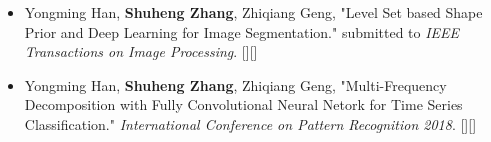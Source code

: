 %
%


\begin{itemize}
	\item Yongming Han, \textbf{Shuheng Zhang}, Zhiqiang Geng, "Level Set based Shape Prior and Deep Learning for Image Segmentation." submitted to \emph{IEEE Transactions on Image Processing}. [\href{https://github.com/zsh965866221/LevelSet-ShapePrior-DeepLearning}{\color{blue}{Github}}][\href{https://github.com/zsh965866221/LevelSet-ShapePrior-DeepLearning/raw/master/2018-06-22-Level\%20Set\%20based\%20Shape\%20Prior\%20and\%20Deep\%20Learning\%20for\%20Image\%20Segmentation.pdf}{\color{blue}{{\color{blue}{pdf}}}}] \\
	 { \footnotesize {}}
	\item Yongming Han, \textbf{Shuheng Zhang}, Zhiqiang Geng, "Multi-Frequency Decomposition with Fully Convolutional Neural Netork for Time Series Classification." \emph{International Conference on Pattern Recognition 2018}. [\href{https://github.com/zsh965866221/MFD-FCN}{\color{blue}{Github}}][\href{https://github.com/zsh965866221/MFD-FCN/raw/master/MFD-FCN_paper.pdf}{\color{blue}{pdf}}]\\
	 { \footnotesize {}}
\end{itemize}